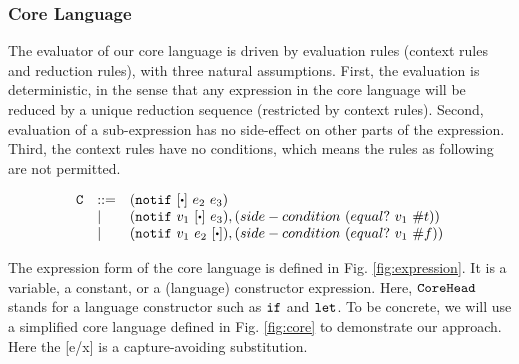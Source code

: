 \subsubsection{Core Language}


The evaluator of our core language is driven by evaluation rules (context rules and reduction rules), with three natural assumptions. First, the evaluation is deterministic, in the sense that any expression in the core language will be reduced by a unique reduction sequence (restricted by context rules). Second, evaluation of a sub-expression has no side-effect on other parts of the expression. Third, the context rules have no conditions, which means the rules as following are not permitted.

{\footnotesize
\[
\begin{array}{lll}
\m{C}& ::= & (\m{notif}~[\bigcdot]~e_2~e_3)\\
&|& (\m{notif}~v_1~[\bigcdot]~e_3), (side-condition~(equal?~v_1~\true))\\
&|& (\m{notif}~v_1~e_2~[\bigcdot]), (side-condition~(equal?~v_1~\false))
\end{array}
\]}



The expression form of the core language is defined in Fig. \ref{fig:expression}. It is a variable, a constant, or a (language) constructor expression. Here, $\mbox{\tt CoreHead}$ stands for a language constructor such as $\mbox{\tt if}$ and $\mbox{\tt let}$. To be concrete, we will use a simplified core language defined in Fig.  \ref{fig:core} to demonstrate our approach. Here the [e/x] is a capture-avoiding substitution.

